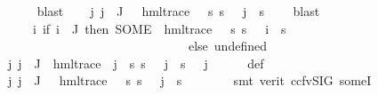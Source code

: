 \begin{isabellebody}
\ \ \ \ \isamarkupfalse%
\ blast\isanewline
\ \ \isamarkupfalse%
\ {\isachardoublequoteopen}{\isasymAnd}j{\isachardot}{\kern0pt}\ j\ {\isasymin}\ J\ {\isasymLongrightarrow}\ {\isasymexists}{\isasympsi}{\isachardot}{\kern0pt}\ hml{\isacharunderscore}{\kern0pt}trace\ {\isasympsi}\ {\isasymand}\ {\isacharparenleft}{\kern0pt}{\isasymforall}s{\isachardot}{\kern0pt}\ s\ {\isasymTurnstile}\ {\isasymPhi}\ j\ {\isasymlongleftrightarrow}\ s\ {\isasymTurnstile}\ {\isasympsi}{\isacharparenright}{\kern0pt}{\isachardoublequoteclose}\ \isamarkupfalse%
\ blast\isanewline
\ \ \isamarkupfalse%
\ {\isasymPsi}\ \ {\isachardoublequoteopen}{\isasymPsi}\ {\isasymequiv}\ {\isacharparenleft}{\kern0pt}{\isasymlambda}i{\isachardot}{\kern0pt}\ {\isacharparenleft}{\kern0pt}if\ i\ {\isasymin}\ J\ then\ {\isacharparenleft}{\kern0pt}SOME\ {\isasympsi}{\isachardot}{\kern0pt}\ hml{\isacharunderscore}{\kern0pt}trace\ {\isasympsi}\ {\isasymand}\ {\isacharparenleft}{\kern0pt}{\isasymforall}s{\isachardot}{\kern0pt}\ s\ {\isasymTurnstile}\ {\isasymPhi}\ i\ {\isasymlongleftrightarrow}\ s\ {\isasymTurnstile}\ {\isasympsi}{\isacharparenright}{\kern0pt}{\isacharparenright}{\kern0pt}\ \isanewline
\ \ \ \ \ \ \ \ \ \ \ \ \ \ \ \ \ \ \ \ \ \ \ \ \ \ \ \ \ \ else\ undefined{\isacharparenright}{\kern0pt}{\isacharparenright}{\kern0pt}{\isachardoublequoteclose}\isanewline
\ \ \isamarkupfalse%
\ {\isachardoublequoteopen}{\isasymAnd}j{\isachardot}{\kern0pt}\ j\ {\isasymin}\ J\ {\isasymLongrightarrow}\ hml{\isacharunderscore}{\kern0pt}trace\ {\isacharparenleft}{\kern0pt}{\isasymPsi}\ j{\isacharparenright}{\kern0pt}\ {\isasymand}\ {\isacharparenleft}{\kern0pt}{\isasymforall}s{\isachardot}{\kern0pt}\ s\ {\isasymTurnstile}\ {\isasymPhi}\ j\ {\isasymlongleftrightarrow}\ s\ {\isasymTurnstile}\ {\isasymPsi}\ j{\isacharparenright}{\kern0pt}{\isachardoublequoteclose}\isanewline
\ \ \ \ \isamarkupfalse%
\ {\isasymPsi}{\isacharunderscore}{\kern0pt}def\ \isamarkupfalse%
\ {\isacartoucheopen}{\isasymAnd}j{\isachardot}{\kern0pt}\ j\ {\isasymin}\ J\ {\isasymLongrightarrow}\ {\isasymexists}{\isasympsi}{\isachardot}{\kern0pt}\ hml{\isacharunderscore}{\kern0pt}trace\ {\isasympsi}\ {\isasymand}\ {\isacharparenleft}{\kern0pt}{\isasymforall}s{\isachardot}{\kern0pt}\ s\ {\isasymTurnstile}\ {\isasymPhi}\ j\ {\isasymlongleftrightarrow}\ s\ {\isasymTurnstile}\ {\isasympsi}{\isacharparenright}{\kern0pt}{\isacartoucheclose}\isanewline
\ \ \ \ \isamarkupfalse%
\ {\isacharparenleft}{\kern0pt}smt\ {\isacharparenleft}{\kern0pt}verit{\isacharcomma}{\kern0pt}\ ccfv{\isacharunderscore}{\kern0pt}SIG{\isacharparenright}{\kern0pt}\ someI{\isacharparenright}{\kern0pt}\isanewline

\end{isabellebody}
